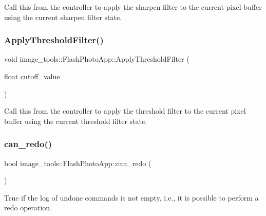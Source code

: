 Call this from the controller to apply the sharpen filter to the current pixel buffer using the current sharpen filter state. \mbox{\label{classimage__tools_1_1FlashPhotoApp_aa24ef843ca6afb25886ef687d5e6c525}} 
\subsubsection{\texorpdfstring{Apply\+Threshold\+Filter()}{ApplyThresholdFilter()}}
{\footnotesize\ttfamily void image\+\_\+tools\+::\+Flash\+Photo\+App\+::\+Apply\+Threshold\+Filter (\begin{DoxyParamCaption}\item[{float}]{cutoff\+\_\+value }\end{DoxyParamCaption})}

Call this from the controller to apply the threshold filter to the current pixel buffer using the current threshold filter state. \mbox{\label{classimage__tools_1_1FlashPhotoApp_aa7fa6acb2590551d56f0130d94814b95}} 
\subsubsection{\texorpdfstring{can\+\_\+redo()}{can\_redo()}}
{\footnotesize\ttfamily bool image\+\_\+tools\+::\+Flash\+Photo\+App\+::can\+\_\+redo (\begin{DoxyParamCaption}{ }\end{DoxyParamCaption})}

True if the log of undone commands is not empty, i.\+e., it is possible to perform a redo operation. \mbox{\label{classimage__tools_1_1FlashPhotoApp_a2699fa48bf3912260480ec4f966af03c}} 
